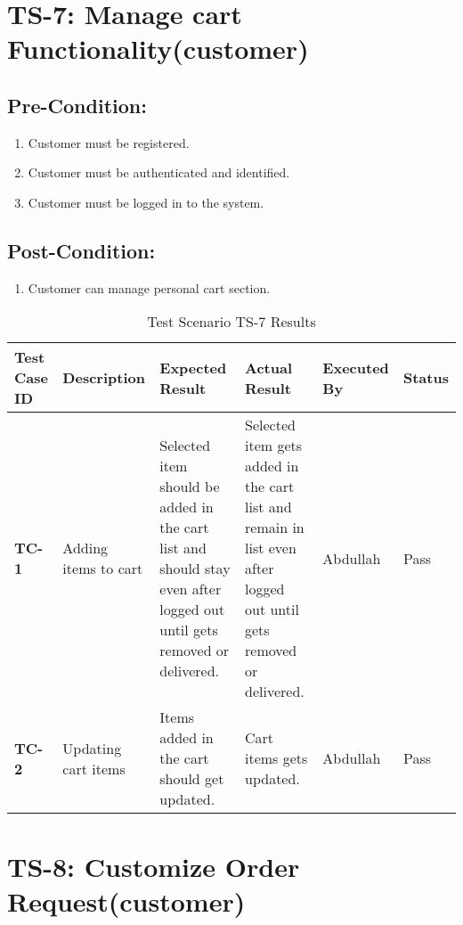 \section{TS-7: Manage cart Functionality(customer)}
\subsection{Pre-Condition:}
\begin{enumerate}
  \item Customer must be registered.
  \item Customer must be authenticated and identified.
  \item Customer must be logged in to the system.
\end{enumerate}
\subsection{Post-Condition:}
\begin{enumerate}
  \item Customer can manage personal cart section.
\end{enumerate}

\begin{table}[H]
    \centering
   \begin{tabular}{ | m{1cm} | m{2.5cm}| m{2.7cm} | m{2.7cm} | m{1.7cm} | m{1.3cm} |}  
  \hline  \textbf{Test Case ID} &  \textbf{Description} &  \textbf{Expected Result} &  \textbf{Actual Result} &  \textbf{Executed By} &  \textbf{Status}  \\  \hline
  \textbf{TC-1} & Adding items to cart & Selected item should be added in the cart list and should stay even after logged out until gets removed or delivered. & Selected item gets added in the cart list and remain in list even after logged out until gets removed or delivered. & Abdullah & Pass
  \\  \hline
  \textbf{TC-2} & Updating cart items & Items added in the cart should get updated. & Cart items gets updated. & Abdullah & Pass
  \\  \hline
  
\end{tabular}
    \caption{Test Scenario TS-7 Results}
    \label{tab: Test Scenario TS-7 Results}
\end{table}

\section{TS-8: Customize Order Request(customer)}
